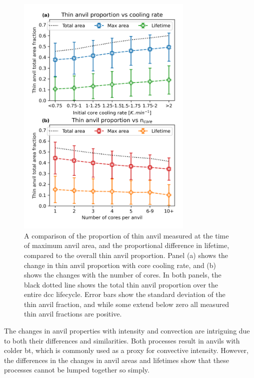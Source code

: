\begin{figure}[tp]
    \centering
    \includegraphics[width=0.75\textwidth]{figures/chapter3_08.png}
    \caption[
    A comparison of the proportion of thin anvil measured at the time of maximum anvil area, and the proportional difference in lifetime, compared to the overall thin anvil proportion.
    ]{
    A comparison of the proportion of thin anvil measured at the time of maximum anvil area, and the proportional difference in lifetime, compared to the overall thin anvil proportion. Panel (a) shows the change in thin anvil proportion with core cooling rate, and (b) shows the changes with the number of cores. In both panels, the black dotted line shows the total thin anvil proportion over the entire \acrshort{dcc} lifecycle. Error bars show the standard deviation of the thin anvil fraction, and while some extend below zero all measured thin anvil fractions are positive.
    }
    \label{fig:max_area_and_lifetime_contributions}
\end{figure}

The changes in anvil properties with intensity and convection are intriguing due to both their differences and similarities.
Both processes result in anvils with colder \acrshort{bt}, which is commonly used as a proxy for convective intensity.
However, the differences in the changes in anvil areas and lifetimes show that these processes cannot be lumped together so simply.


